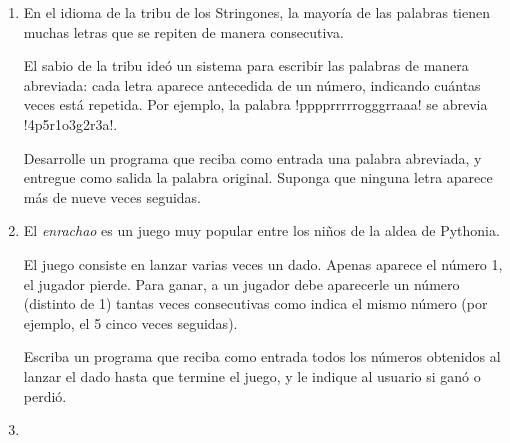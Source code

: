\documentclass[11pt,spanish]{article}
\newcommand{\pond}[1]{[{\small\textbf{#1\%}}]}
\begin{document}
\begin{enumerate}[font=\Large\bfseries]
    \newpage
    \item
      \pond{25}
      En el idioma de la tribu de los Stringones,
      la mayoría de las palabras tienen muchas letras
      que se repiten de manera consecutiva.

      El sabio de la tribu ideó un sistema
      para escribir las palabras de manera abreviada:
      cada letra aparece antecedida de un número,
      indicando cuántas veces está repetida.
      Por ejemplo, la palabra \li!pppprrrrrogggrraaa!
      se abrevia \li!4p5r1o3g2r3a!.

      Desarrolle un programa
      que reciba como entrada una palabra abreviada,
      y entregue como salida la palabra original.
      Suponga que ninguna letra
      aparece más de nueve veces seguidas.

    \newpage
    \item
      \pond{25}
      El \emph{enrachao} es un juego muy popular
      entre los niños de la aldea de Pythonia.

      El juego consiste en lanzar varias veces un dado.
      Apenas aparece el número 1, el jugador pierde.
      Para ganar, a un jugador debe aparecerle un número
      (distinto de 1)
      tantas veces consecutivas como indica el mismo número
      (por ejemplo, el 5 cinco veces seguidas).

      Escriba un programa que reciba como entrada
      todos los números obtenidos al lanzar el dado
      hasta que termine el juego,
      y le indique al usuario si ganó o perdió.

      \begin{minipage}[t]{.26\textwidth}
        
      \end{minipage}
      \hspace{1em}
      \begin{minipage}[t]{.26\textwidth}
        
      \end{minipage}

    \newpage
    \item
      \pond{25}

  \end{enumerate}
\end{document}
